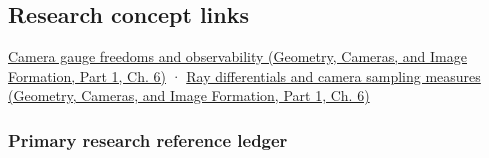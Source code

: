 \subsection{Research concept links}\label{02-foundations-ii-ch039-research-concept-links}

\hypertarget{02-foundations-ii-ch039-research-concept-links}{}

\href{../03-Geometry-Cameras-and-Image-Formation-P01/main.pdf\#02-foundations-ii-ch037-a-camera-model-must-close-the-loop}{Camera gauge freedoms and observability (Geometry, Cameras, and Image Formation, Part 1, Ch. 6)} · \href{../03-Geometry-Cameras-and-Image-Formation-P01/main.pdf\#02-foundations-ii-ch037-a-camera-model-must-close-the-loop}{Ray differentials and camera sampling measures (Geometry, Cameras, and Image Formation, Part 1, Ch. 6)}

\subsubsection{Primary research reference ledger}\label{02-foundations-ii-ch039-primary-research-reference-ledger}

\hypertarget{02-foundations-ii-ch039-primary-research-reference-ledger}{}

